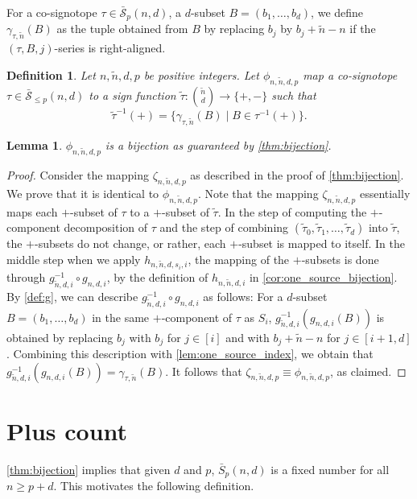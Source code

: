 \documentclass[a4paper,11pt]{amsart}
\newtheorem{lemma}[theorem]{Lemma}
\newtheorem{definition}[theorem]{Definition}
\newcommand{\calS}{\mathcal{S}}
\newcommand{\tn}{\tilde{n}}
\begin{document}
For a co-signotope $\tau \in \bar{\calS}_p(n,d)$, a $d$-subset $B = (b_1, \dots, b_d)$, we define $\gamma_{\tau, \tn}(B)$ as the tuple obtained from $B$ by replacing $b_j$ by $b_j + \tn -n$ if the $(\tau,B,j)$-series is right-aligned.

\begin{definition}
    Let $n, \tilde{n}, d,p$ be positive integers.
    Let $\phi_{n,\tn,d,p}$ map a co-signotope $\tau \in \bar{\calS}_{\leq p}(n,d)$ to a sign function $\tilde{\tau}: {\tn \choose d} \to \{+,-\}$ such that
    \[
        \tilde{\tau}^{-1}(+) = \Big\{\gamma_{\tau, \tn}(B) \mid B \in \tau^{-1}(+)\Big\}.
    \]
\end{definition}

\begin{lemma}
\label{lem:bijection}
    $\phi_{n,\tn,d,p}$ is a bijection as guaranteed by \cref{thm:bijection}.
\end{lemma}
\begin{proof}
    Consider the mapping $\zeta_{n,\tn,d,p}$ as described in the proof of \cref{thm:bijection}.
    We prove that it is identical to $\phi_{n,\tn,d,p}$.
    Note that the mapping $\zeta_{n,\tn,d,p}$ essentially maps each $+$-subset of $\tau$ to a $+$-subset of $\tilde{\tau}$.
    In the step of computing the $+$-component decomposition of $\tau$ and the step of combining $(\tilde{\tau}_0,\tilde{\tau}_1,\dots,\tilde{\tau}_d)$ into $\tilde{\tau}$, the $+$-subsets do not change, or rather, each $+$-subset is mapped to itself.
    In the middle step when we apply $h_{n,\tn,d,s_i,i}$, the mapping of the $+$-subsets is done through $g^{-1}_{\tn,d,i}\circ g_{n,d,i}$, by the definition of $h_{n,\tn,d,i}$ in \cref{cor:one_source_bijection}.
    By \cref{def:g}, we can describe $g^{-1}_{\tn,d,i}\circ g_{n,d,i}$ as follows:
    For a $d$-subset $B=(b_1, \dots, b_d)$ in the same $+$-component of $\tau$ as $S_i$, $g^{-1}_{\tn,d,i}( g_{n,d,i}(B))$ is obtained by replacing $b_j$ with $b_j$ for $j \in [i]$ and with $b_j+\tn-n $ for $j \in [i+1,d]$.
    Combining this description with \cref{lem:one_source_index}, we obtain that $g^{-1}_{\tn,d,i}( g_{n,d,i}(B)) = \gamma_{\tau,\tn}(B)$.
    It follows that $\zeta_{n,\tn,d,p} \equiv \phi_{n,\tn,d,p}$, as claimed.
\end{proof}

\section{Plus count}
\label{sec:count}

\cref{thm:bijection} implies that given $d$ and $p$, $\bar{S}_p(n,d)$ is a fixed number for all $n \geq p + d$.
This motivates the following definition.
\end{document}
